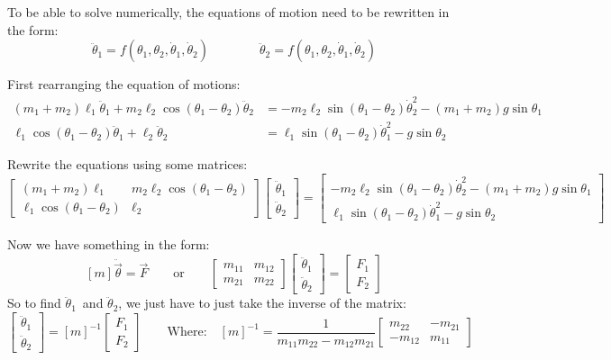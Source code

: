 \documentclass[letterpaper,8pt]{article}
\begin{document}
To be able to solve numerically, the equations of motion need to be rewritten in the form:
\[
\ddot{\theta}_1 = f (\theta_1, \theta_2, \dot{\theta}_1, \dot{\theta}_2)
\qquad\qquad
\ddot{\theta}_2 = f (\theta_1, \theta_2, \dot{\theta}_1, \dot{\theta}_2)
\]

First rearranging the equation of motions:
\begin{align*}
(m_1 + m_2)\ell_1 \ddot{\theta}_1 + m_2 \ell_2 \cos (\theta_1 - \theta_2) \ddot{\theta}_2 &=
          - m_2\ell_2 \sin (\theta_1 - \theta_2) \dot{\theta}_2^2 - (m_1 + m_2) g \sin \theta_1  \\
\ell_1 \cos(\theta_1 - \theta_2) \ddot{\theta}_1 + \ell_2 \ddot{\theta}_2 &=
           \ell_1 \sin (\theta_1 - \theta_2) \dot{\theta}_1^2 - g \sin \theta_2 
\end{align*}

Rewrite the equations using some matrices:
\[
\left[
\begin{array}{cc}
(m_1 + m_2)\ell_1 & m_2 \ell_2 \cos (\theta_1 - \theta_2) \\
\ell_1 \cos(\theta_1 - \theta_2) & \ell_2 
\end{array}
\right]
\left[
\begin{array}{c}
\ddot{\theta}_1 \\
\ddot{\theta}_2
\end{array}
\right]
= 
\left[
\begin{array}{c}
- m_2\ell_2 \sin (\theta_1 - \theta_2) \dot{\theta}_2^2 - (m_1 + m_2) g \sin \theta_1 \\
\ell_1 \sin (\theta_1 - \theta_2) \dot{\theta}_1^2 - g \sin \theta_2
\end{array}
\right]
\]

Now we have something in the form:
\[
[m] \ddot{\vec{\theta}} = \vec{F}
\qquad \text{or} \qquad
\left[
\begin{array}{cc}
m_{11} & m_{12} \\
m_{21} & m_{22}
\end{array}
\right]
\left[
\begin{array}{c}
\ddot{\theta}_1 \\
\ddot{\theta}_2
\end{array}
\right]
=
\left[
\begin{array}{c}
F_1 \\
F_2
\end{array}
\right]
\]
So to find $\ddot{\theta}_1$\ and $\ddot{\theta}_2$, we just have to just take the inverse of the matrix:
\[
\left[
\begin{array}{c}
\ddot{\theta}_1 \\
\ddot{\theta}_2
\end{array}
\right]
=
[m]^{-1} 
\left[
\begin{array}{c}
F_1 \\
F_2
\end{array}
\right]
\qquad
\text{Where:}
\quad
[m]^{-1} = 
\frac{1}{m_{11}m_{22} - m_{12}m_{21}}
\left[
\begin{array}{cc}
 m_{22} & -m_{21} \\
-m_{12} &  m_{11}
\end{array}
\right]
\]
\end{document}
